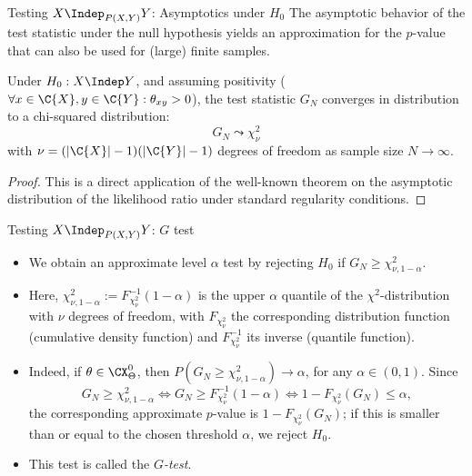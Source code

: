 \begin{frame}{Testing $X \Indep_{P(X,Y)} Y$: Asymptotics under $H_0$}
The asymptotic behavior of the test statistic under the null hypothesis yields
an approximation for the $p$-value that can also be used for (large) finite samples.
\begin{Prp}[\ref{prp:G_test_asymptotics_H0}]
Under $H_0 : X \Indep Y$, and assuming positivity ($\forall x \in \C{X}, y\in \C{Y}: \theta_{xy} > 0$),
the test statistic $G_N$ converges in distribution to a chi-squared distribution:
$$G_N \leadsto \chi_\nu^2$$
with $\nu = (|\C{X}| - 1)(|\C{Y}| - 1)$ degrees of freedom as sample size $N \to \infty$.
\end{Prp}
\begin{proof}
  This is a direct application of the well-known theorem on the asymptotic distribution of the likelihood ratio under standard regularity conditions.
\end{proof}
\end{frame}

\begin{frame}{Testing $X \Indep_{P(X,Y)} Y$: $G$ test}
  \begin{itemize}
    \item We obtain an approximate level $\alpha$ test by rejecting $H_0$ if $G_N \ge \chi_{\nu,1-\alpha}^2$. 
    \item Here, $\chi^2_{\nu,1-\alpha} := F_{\chi^2_\nu}^{-1}(1-\alpha)$ is the upper $\alpha$ quantile of the $\chi^2$-distribution with $\nu$ degrees of freedom, with $F_{\chi^2_\nu}$ the corresponding distribution function (cumulative density function) and $F^{-1}_{\chi^2_\nu}$ its inverse (quantile function).
    \item Indeed, if $\theta \in \CX_\Theta^0$, then $P(G_N \ge \chi_{\nu,1-\alpha}^2) \to \alpha$, for any $\alpha \in (0,1)$.
Since 
$$G_N \ge \chi_{\nu,1-\alpha}^2 \iff G_N \ge F_{\chi^2_\nu}^{-1}(1-\alpha) \iff 1-F_{\chi^2_\nu}(G_N) \le \alpha,$$
the corresponding approximate $p$-value is $1 - F_{\chi^2_\nu}(G_N)$; if this is smaller than or equal to the chosen threshold $\alpha$, we reject $H_0$.
\item This test is called the \emph{$G$-test}.
  \end{itemize}
\end{frame}


